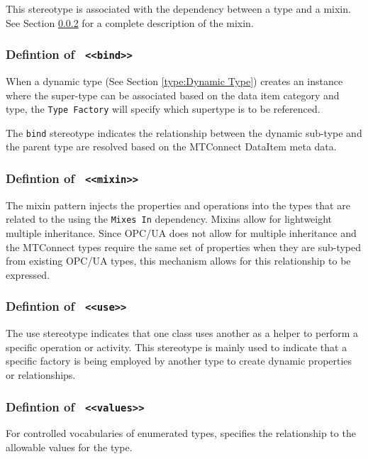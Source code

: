 \FloatBarrier

This stereotype is associated with the dependency between a type and a mixin. See Section \ref{type:mixin} for a complete 
description of the mixin.

\FloatBarrier
\subsubsection{Defintion of \texttt{ <<bind>>}}
  \label{type:bind}

\FloatBarrier

When a dynamic type (See Section \ref{type:Dynamic Type}) creates an instance where the super-type
can be associated based on the data item category and type, the \texttt{Type Factory} will 
specify which supertype is to be referenced.

The \texttt{bind} stereotype indicates the relationship between the dynamic sub-type and the 
parent type are resolved based on the MTConnect DataItem meta data.

\FloatBarrier
\subsubsection{Defintion of \texttt{ <<mixin>>}}
  \label{type:mixin}

\FloatBarrier

The mixin pattern injects the properties and operations into the types 
that are related to the using the \texttt{Mixes In} dependency. Mixins allow for
lightweight multiple inheritance. Since OPC/UA does not allow for multiple inheritance 
and the MTConnect  types require the same set of properties when they are sub-typed
from existing OPC/UA types, this mechanism allows for this relationship to be expressed.


\FloatBarrier
\subsubsection{Defintion of \texttt{ <<use>>}}
  \label{type:use}

\FloatBarrier

The use stereotype indicates that one class uses another as a helper to perform 
a specific operation or activity. This stereotype is mainly used to indicate
that a specific factory is being employed by another type to create dynamic
properties or relationships.

\FloatBarrier
\subsubsection{Defintion of \texttt{ <<values>>}}
  \label{type:values}

\FloatBarrier

For controlled vocabularies of enumerated types, specifies the relationship to the allowable 
values for the type.

\FloatBarrier
